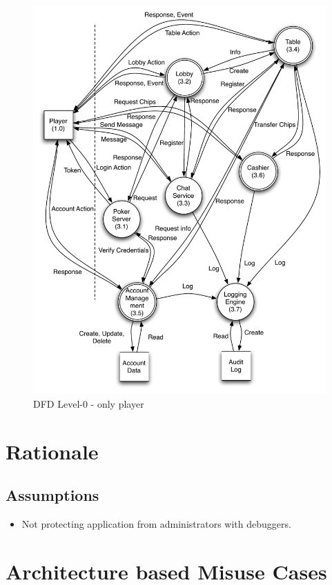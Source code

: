\documentclass[a4paper,11pt]{report}
\begin{document}
\begin{figure}
  \begin{center}
    \includegraphics[scale=0.7]{dfd_level_0_player}
  \end{center}
  \caption{DFD Level-0 - only player}\label{fig:level_0_player}
\end{figure}

\section{Rationale}
\subsection{Assumptions}
\begin{itemize}
\item Not protecting application from administrators with debuggers.
\end{itemize}

\section{Architecture based Misuse Cases}
\end{document}
